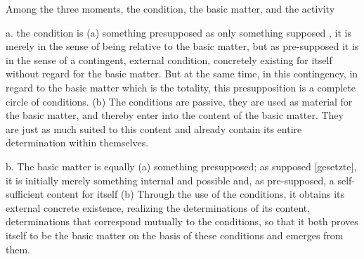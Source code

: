 Among the three moments, the condition, the basic matter, and the activity

a. the condition is (a) something presupposed as only
something supposed , it is merely in the sense of being relative
to the basic matter, but as pre-supposed it is in the sense of
a contingent, external condition, concretely existing for itself without
regard for the basic matter. But at the same time, in this contingency,
in regard to the basic matter which is the totality, this presupposition
is a complete circle of conditions. (b) The conditions are passive, they are
used as material for the basic matter, and thereby enter into the content
of the basic matter. They are just as much suited to this content and
already contain its entire determination within themselves.

b. The basic matter is equally (a) something presupposed; as supposed
[gesetzte], it is initially merely something internal and possible and, as
pre-supposed, a self-sufficient content for itself (b) Through the use of
the conditions, it obtains its external concrete existence, realizing the
determinations of its content, determinations that correspond mutually
to the conditions, so that it both proves itself to be the basic matter on
the basis of these conditions and emerges from them.

